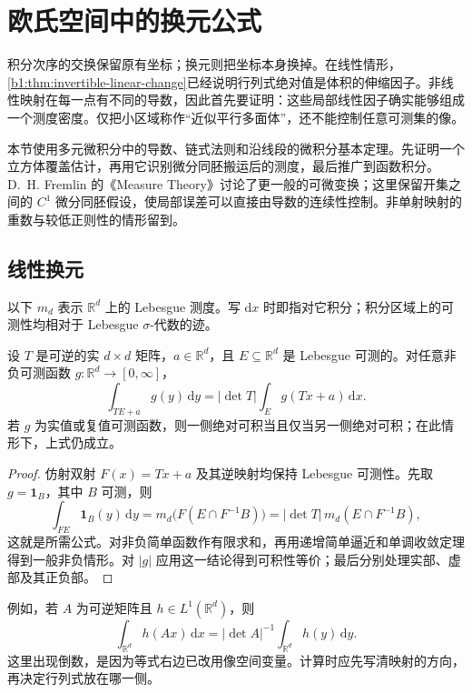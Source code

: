 \section{欧氏空间中的换元公式}
\label{b1:sec:0705}

积分次序的交换保留原有坐标；换元则把坐标本身换掉。在线性情形，\cref{b1:thm:invertible-linear-change}已经说明行列式绝对值是体积的伸缩因子。非线性映射在每一点有不同的导数，因此首先要证明：这些局部线性因子确实能够组成一个测度密度。仅把小区域称作“近似平行多面体”，还不能控制任意可测集的像。

\ProseParagraphBreak

本节使用多元微积分中的导数、链式法则和沿线段的微积分基本定理。先证明一个立方体覆盖估计，再用它识别微分同胚搬运后的测度，最后推广到函数积分。D.~H. Fremlin 的《Measure Theory》\cite[Volume 2, \S263]{Fremlin2016Measure}讨论了更一般的可微变换；这里保留开集之间的 \(C^1\) 微分同胚假设，使局部误差可以直接由导数的连续性控制。非单射映射的重数与较低正则性的情形留到。

\subsection{线性换元}
\label{b1:subsec:070501}

以下 \(m_d\) 表示 \(\mathbb R^d\) 上的 Lebesgue 测度。写 \(\mathrm{d}x\) 时即指对它积分；积分区域上的可测性均相对于 Lebesgue \(\sigma\)-代数的迹。

\begin{proposition}\label{b1:prop:affine-integral-change}
设 \(T\) 是可逆的实 \(d\times d\) 矩阵，\(a\in\mathbb R^d\)，且 \(E\subseteq\mathbb R^d\) 是 Lebesgue 可测的。对任意非负可测函数 \(g:\mathbb R^d\rightarrow[0,\infty]\)，
\[
\int_{TE+a}g(y)\,\mathrm{d}y
=|\det T|\int_E g(Tx+a)\,\mathrm{d}x.
\]
若 \(g\) 为实值或复值可测函数，则一侧绝对可积当且仅当另一侧绝对可积；在此情形下，上式仍成立。
\end{proposition}
\begin{proof}
仿射双射 \(F(x)=Tx+a\) 及其逆映射均保持 Lebesgue 可测性。先取 \(g=\mathbf1_B\)，其中 \(B\) 可测，则
\[
\int_{FE}\mathbf1_B(y)\,\mathrm{d}y
=m_d\bigl(F(E\cap F^{-1}B)\bigr)
=|\det T|\,m_d(E\cap F^{-1}B),
\]
这就是所需公式。对非负简单函数作有限求和，再用递增简单逼近和单调收敛定理得到一般非负情形。对 \(|g|\) 应用这一结论得到可积性等价；最后分别处理实部、虚部及其正负部。
\end{proof}

例如，若 \(A\) 为可逆矩阵且 \(h\in L^1(\mathbb R^d)\)，则
\[
\int_{\mathbb R^d}h(Ax)\,\mathrm{d}x
=|\det A|^{-1}\int_{\mathbb R^d}h(y)\,\mathrm{d}y.
\]
这里出现倒数，是因为等式右边已改用像空间变量。计算时应先写清映射的方向，再决定行列式放在哪一侧。

